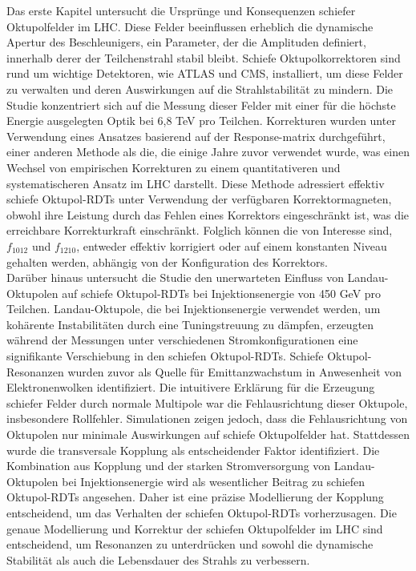 {%
Das erste Kapitel untersucht die Ursprünge und Konsequenzen schiefer Oktupolfelder im LHC. Diese Felder beeinflussen erheblich die dynamische Apertur des Beschleunigers, ein Parameter, der die Amplituden definiert, innerhalb derer der Teilchenstrahl stabil bleibt. Schiefe Oktupolkorrektoren sind rund um wichtige Detektoren, wie ATLAS und CMS, installiert, um diese Felder zu verwalten und deren Auswirkungen auf die Strahlstabilität zu mindern. Die Studie konzentriert sich auf die Messung dieser Felder mit einer für die höchste Energie ausgelegten Optik bei 6,8 TeV pro Teilchen. Korrekturen wurden unter Verwendung eines Ansatzes basierend auf der Response-matrix durchgeführt, einer anderen Methode als die, die einige Jahre zuvor verwendet wurde, was einen Wechsel von empirischen Korrekturen zu einem quantitativeren und systematischeren Ansatz im LHC darstellt. 
Diese Methode adressiert effektiv schiefe Oktupol-RDTs unter Verwendung der verfügbaren Korrektormagneten, obwohl ihre Leistung durch das Fehlen eines Korrektors eingeschränkt ist, was die erreichbare Korrekturkraft einschränkt. Folglich können die von Interesse sind, $f_{1012}$ und $f_{1210}$, entweder effektiv korrigiert oder auf einem konstanten Niveau gehalten werden, abhängig von der Konfiguration des Korrektors.
\\
\indent
Darüber hinaus untersucht die Studie den unerwarteten Einfluss von Landau-Oktupolen auf schiefe Oktupol-RDTs bei Injektionsenergie von 450 GeV pro Teilchen. Landau-Oktupole, die bei Injektionsenergie verwendet werden, um kohärente Instabilitäten durch eine Tuningstreuung zu dämpfen, erzeugten während der Messungen unter verschiedenen Stromkonfigurationen eine signifikante Verschiebung in den schiefen Oktupol-RDTs. Schiefe Oktupol-Resonanzen wurden zuvor als Quelle für Emittanzwachstum in Anwesenheit von Elektronenwolken identifiziert. Die intuitivere Erklärung für die Erzeugung schiefer Felder durch normale Multipole war die Fehlausrichtung dieser Oktupole, insbesondere Rollfehler. Simulationen zeigen jedoch, dass die Fehlausrichtung von Oktupolen nur minimale Auswirkungen auf schiefe Oktupolfelder hat. Stattdessen wurde die transversale Kopplung als entscheidender Faktor identifiziert. Die Kombination aus Kopplung und der starken Stromversorgung von Landau-Oktupolen bei Injektionsenergie wird als wesentlicher Beitrag zu schiefen Oktupol-RDTs angesehen. Daher ist eine präzise Modellierung der Kopplung entscheidend, um das Verhalten der schiefen Oktupol-RDTs vorherzusagen. Die genaue Modellierung und Korrektur der schiefen Oktupolfelder im LHC sind entscheidend, um Resonanzen zu unterdrücken und sowohl die dynamische Stabilität als auch die Lebensdauer des Strahls zu verbessern.

}
